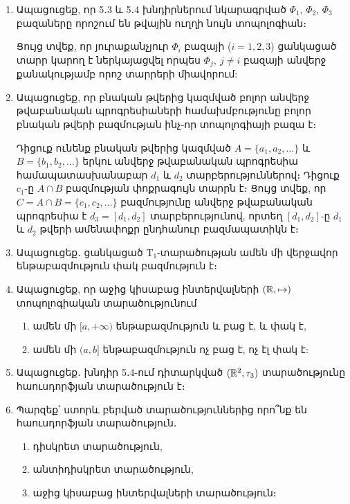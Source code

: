 \begin{enumerate}[label=\thesection.\arabic*.]
\item Ապացուցեք, որ 5․3 և 5․4 խնդիրներում նկարագրված $\Phi_1$, $\Phi_2$, $\Phi_3$ բազաները որոշում են թվային ուղղի նույն տոպոլոգիան։

\begin{hint}
  Ցույց տվեք, որ յուրաքանչյուր $\Phi_i$ բազայի ($i=1, 2, 3$) ցանկացած տարր կարող է ներկայացվել որպես $\Phi_j,\ j \not= i$ բազայի անվերջ քանակությամբ որոշ տարրերի միավորում:
\end{hint}

\item Ապացուցեք, որ բնական թվերից կազմված բոլոր անվերջ թվաբանական \linebreak պրոգ\-րե\-սիաների համախմբությունը բոլոր բնական թվերի բազմության ինչ-որ տոպո\-լո\-գիայի բազա է։

\begin{hint}
Դիցուք ունենք բնական թվերից կազմված $A=\{a_1, a_2, \dots\}$ և $B=\{b_1, b_2, \dots\}$ երկու անվերջ թվաբանական պրոգրեսիա համապատաս\-խա\-նաբար $d_1$ և $d_2$ տարբերություններով։ Դիցուք $c_1$-ը $A\cap B$ բազմության փոք\-րա\-գույն տարրն է։ Ցույց տվեք, որ $C=A \cap B=\{c_1, c_2, \dots \}$ բազմությունը ան\-վերջ թվաբանական պրոգրեսիա է $d_3=[d_1, d_2]$ տարբերությունով, որտեղ $[d_1, d_2]$-ը $d_1$ և $d_2$ թվերի ամենափոքր ընդհանուր բազմապատիկն է։
\end{hint}

\item Ապացուցեք․ ցանկացած $\textrm{T}_1$-տարածության ամեն մի վերջավոր ենթա\-բազ\-մու\-թյուն փակ բազմություն է։

\item Ապացուցեք, որ աջից կիսաբաց ինտերվալների $(\mathbb{R}, \mapsto)$ տոպոլոգիական  \linebreak տարա\-ծու\-թյունում
\begin{enumerate}
    \item[ա)] ամեն մի $[a, +\infty)$ ենթաբազմություն և բաց է, և փակ է,
    
    \item[բ)] ամեն մի $(a, b]$ ենթաբազմություն ոչ բաց է, ոչ էլ փակ է:
\end{enumerate}


\item Ապացուցեք․ խնդիր 5․4-ում դիտարկված $(\mathbb{R}^2, \tau_3)$ տարածությունը հաուս\-դորֆ\-յան տարածություն է։

\item Պարզեք՝ ստորև բերված տարածություններից որո՞նք են հաուսդորֆյան  \linebreak տարա\-ծու\-թյուն․
\begin{enumerate}
    \item[ա)] դիսկրետ տարածություն,
    \item[բ)] անտիդիսկրետ տարածություն,
    \item[գ)] աջից կիսաբաց ինտերվալների տարածություն։
\end{enumerate}

\end{enumerate}